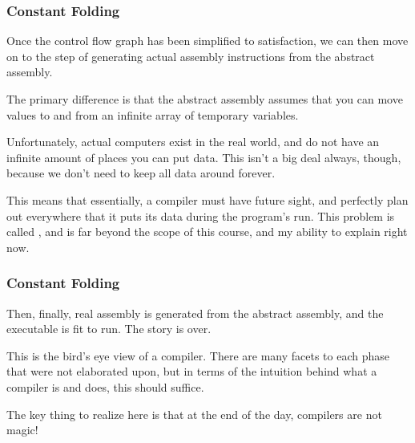 \documentclass[aspectratio=169]{beamer}
\begin{document}
\begin{frame}[fragile]
  \frametitle{Constant Folding}

  Once the control flow graph has been simplified to satisfaction, we can
  then move on to the step of generating actual assembly instructions from
  the abstract assembly.

  \vspace{\fill}

  The primary difference is that the abstract assembly assumes that you can
  move values to and from an infinite array of temporary variables.

  \vspace{\fill}

  Unfortunately, actual computers exist in the real world, and do not have
  an infinite amount of places you can put data. This isn't a big deal always,
  though, because we don't need to keep all data around forever.

  \vspace{\fill}

  This means that essentially, a compiler must have future sight, and perfectly
  plan out everywhere that it puts its data during the program's run. This
  problem is called , and is far beyond the
  scope of this course, and my ability to explain right now.
\end{frame}

\begin{frame}[fragile]
  \frametitle{Constant Folding}

  Then, finally, real assembly is generated from the abstract assembly, and
  the executable is fit to run. The story is over.

  \vspace{\fill}

  This is the bird's eye view of a compiler. There are many facets to each
  phase that were not elaborated upon, but in terms of the intuition behind
  what a compiler is and does, this should suffice.

  \vspace{\fill}

  The key thing to realize here is that at the end of the day, compilers are
  not magic!
\end{frame}
\end{document}
